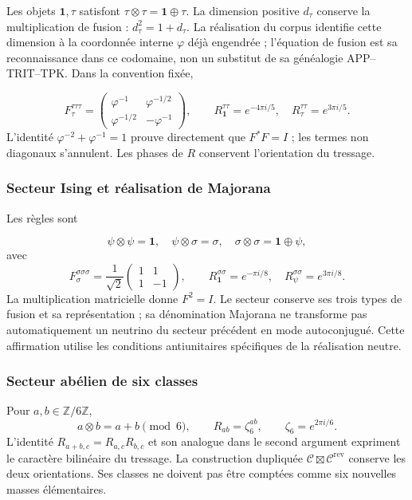 Les objets \(\mathbf1,\tau\) satisfont
\(\tau\otimes\tau=\mathbf1\oplus\tau\). La dimension positive
\(d_\tau\) conserve la multiplication de fusion :
\(d_\tau^2=1+d_\tau\). La réalisation du corpus identifie cette
dimension à la coordonnée interne \(\varphi\) déjà engendrée ;
l’équation de fusion est sa reconnaissance dans ce codomaine, non un
substitut de sa généalogie APP--TRIT--TPK. Dans la convention fixée,

\[
 F_\tau^{\tau\tau\tau}=\begin{pmatrix}
 \varphi^{-1}&\varphi^{-1/2}\\
 \varphi^{-1/2}&-\varphi^{-1}
 \end{pmatrix},\qquad
 R_{\mathbf1}^{\tau\tau}=e^{-4\pi i/5},\quad
 R_\tau^{\tau\tau}=e^{3\pi i/5}.
\]
L’identité \(\varphi^{-2}+\varphi^{-1}=1\) prouve directement
que \(F^*F=I\) ; les termes non diagonaux s’annulent. Les phases
de \(R\) conservent l’orientation du tressage.


\subsubsection{Secteur Ising et réalisation de Majorana
}

Les règles sont

\[
 \psi\otimes\psi=\mathbf1,\quad
 \psi\otimes\sigma=\sigma,\quad
 \sigma\otimes\sigma=\mathbf1\oplus\psi,
\]
avec
\[
 F_\sigma^{\sigma\sigma\sigma}=\frac1{\sqrt2}
 \begin{pmatrix}1&1\\1&-1\end{pmatrix},\qquad
 R_{\mathbf1}^{\sigma\sigma}=e^{-\pi i/8},\quad
 R_\psi^{\sigma\sigma}=e^{3\pi i/8}.
\]
La multiplication matricielle donne \(F^2=I\). Le secteur conserve ses
trois types de fusion et sa représentation ; sa dénomination Majorana
ne transforme pas automatiquement un neutrino du secteur précédent en mode
autoconjugué. Cette affirmation utilise les conditions antiunitaires
spécifiques de la réalisation neutre.


\subsubsection{Secteur abélien de six classes
}

Pour \(a,b\in\mathbb Z/6\mathbb Z\),
\[
 a\otimes b=a+b\pmod6,\qquad
 R_{ab}=\zeta_6^{ab},\qquad\zeta_6=e^{2\pi i/6}.
\]
L’identité \(R_{a+b,c}=R_{a,c}R_{b,c}\) et son analogue dans le
second argument expriment le caractère bilinéaire du tressage.
La construction dupliquée
\(\mathcal C\boxtimes\mathcal C^{\mathrm{rev}}\) conserve les deux
orientations. Ses classes ne doivent pas être comptées comme six nouvelles masses
élémentaires.


